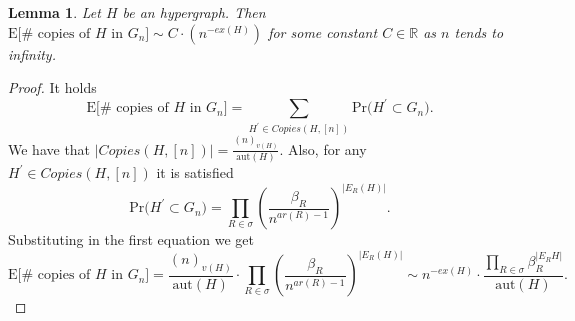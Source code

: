 \documentclass[12pt,notitlepage,a4paper]{article}
\newtheorem{lemma}{Lemma}[section]
\theoremstyle{definition}
\newcommand{\R}{\mathbb{R}}
\newcommand{\PR}[1]{\mathrm{Pr}\big(#1\big)}
\newcommand{\aut}{\mathrm{aut}}
\begin{document}
\begin{lemma}
	Let $H$ be an hypergraph. Then 
	$\mathrm{E}\big[\# \text{ copies of }H \text{ in } G_n\big]\sim
	C\cdot(n^{-ex(H)})$ for some constant $C\in \R$ as $n$ tends to infinity.  
\end{lemma}
\begin{proof}
It holds
\[
 \mathrm{E}\big[\# \text{ copies of }H \text{ in } G_n\big]=
 \sum_{H^\prime \in Copies(H,[n])} \PR{H^\prime \subset G_n}.
\]	
We have that $|Copies(H,[n])|=\frac{(n)_{v(H)}}{\aut(H)}$. Also, 
for any $H^\prime \in Copies(H,[n])$ it is satisfied
\[
\PR{H^\prime \subset G_n}= \prod_{R\in \sigma} \left(\frac{\beta_R}{n^{ar(R)-1}} 
\right)^{|E_R(H)|}.
\]
Substituting in the first equation we get
\[
\mathrm{E}\big[\# \text{ copies of }H \text{ in } G_n\big]=
\frac{(n)_{v(H)}}{\aut(H)}\cdot
\prod_{R\in \sigma} \left(\frac{\beta_R}{n^{ar(R)-1}}\right)^{|E_R(H)|}
\sim
n^{-ex(H)} \cdot \frac{\prod_{R\in \sigma} \beta_R^{
|E_R{H}| }}{\aut(H)}.
\]	




\end{proof}
\end{document}
